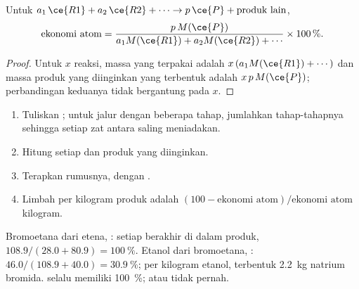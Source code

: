 \begin{proposition}\label{prop:g12:synthesis-strategy:atom-economy}
Untuk  $a_1\,\ce{R1} + a_2\,\ce{R2} + \cdots \rightarrow
p\,\ce{P} + \text{produk lain}$,
\[
  \text{ekonomi atom} =
  \frac{p\,M(\ce{P})}{a_1 M(\ce{R1}) + a_2 M(\ce{R2}) + \cdots}
  \times 100\,\% .
\]
\end{proposition}

\begin{proof}
Untuk $x$  reaksi, massa  yang terpakai adalah
$x\,(a_1 M(\ce{R1}) + \cdots)$ dan massa produk yang diinginkan yang
terbentuk adalah $x\,p\,M(\ce{P})$; perbandingan keduanya tidak
bergantung pada $x$.
\end{proof}

\begin{method}\label{met:g12:synthesis-strategy:atom-economy}
\begin{enumerate}
  \item Tuliskan ; untuk jalur dengan beberapa tahap,
        jumlahkan tahap-tahapnya sehingga setiap zat antara saling
        meniadakan.
  \item Hitung  setiap  dan  produk yang
        diinginkan.
  \item Terapkan rumusnya, dengan .
  \item Limbah per kilogram produk adalah
        $(100 - \text{ekonomi atom})/\text{ekonomi atom}$ kilogram.
\end{enumerate}
\end{method}

\begin{example}\label{ex:g12:synthesis-strategy:compare}
Bromoetana dari etena, : setiap  berakhir
di dalam produk,  $108.9/(28.0 + 80.9) = \qty{100}{\percent}$.
Etanol dari bromoetana, :  $46.0/(108.9 + 40.0) = \qty{30.9}{\percent}$; per kilogram
etanol, terbentuk \qty{2.2}{kg} natrium bromida.  selalu memiliki
 \qty{100}{\percent};  atau  tidak pernah.
\end{example}

